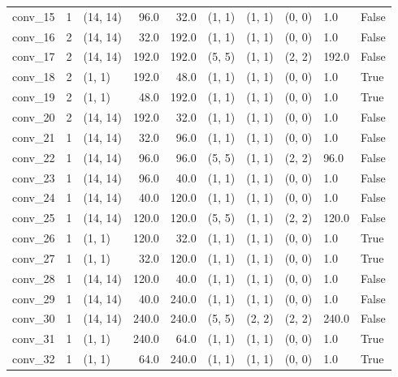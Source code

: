\begin{center}
\begin{tabular}{lrlrrlllll}
        conv\_15 &      1 &    (14, 14) &   96.0 &    32.0 &  (1, 1) &  (1, 1) &  (0, 0) &    1.0 &  False \\
        conv\_16 &      2 &    (14, 14) &   32.0 &   192.0 &  (1, 1) &  (1, 1) &  (0, 0) &    1.0 &  False \\
        conv\_17 &      2 &    (14, 14) &  192.0 &   192.0 &  (5, 5) &  (1, 1) &  (2, 2) &  192.0 &  False \\
        conv\_18 &      2 &      (1, 1) &  192.0 &    48.0 &  (1, 1) &  (1, 1) &  (0, 0) &    1.0 &   True \\
        conv\_19 &      2 &      (1, 1) &   48.0 &   192.0 &  (1, 1) &  (1, 1) &  (0, 0) &    1.0 &   True \\
        conv\_20 &      2 &    (14, 14) &  192.0 &    32.0 &  (1, 1) &  (1, 1) &  (0, 0) &    1.0 &  False \\
        conv\_21 &      1 &    (14, 14) &   32.0 &    96.0 &  (1, 1) &  (1, 1) &  (0, 0) &    1.0 &  False \\
        conv\_22 &      1 &    (14, 14) &   96.0 &    96.0 &  (5, 5) &  (1, 1) &  (2, 2) &   96.0 &  False \\
        conv\_23 &      1 &    (14, 14) &   96.0 &    40.0 &  (1, 1) &  (1, 1) &  (0, 0) &    1.0 &  False \\
        conv\_24 &      1 &    (14, 14) &   40.0 &   120.0 &  (1, 1) &  (1, 1) &  (0, 0) &    1.0 &  False \\
        conv\_25 &      1 &    (14, 14) &  120.0 &   120.0 &  (5, 5) &  (1, 1) &  (2, 2) &  120.0 &  False \\
        conv\_26 &      1 &      (1, 1) &  120.0 &    32.0 &  (1, 1) &  (1, 1) &  (0, 0) &    1.0 &   True \\
        conv\_27 &      1 &      (1, 1) &   32.0 &   120.0 &  (1, 1) &  (1, 1) &  (0, 0) &    1.0 &   True \\
        conv\_28 &      1 &    (14, 14) &  120.0 &    40.0 &  (1, 1) &  (1, 1) &  (0, 0) &    1.0 &  False \\
        conv\_29 &      1 &    (14, 14) &   40.0 &   240.0 &  (1, 1) &  (1, 1) &  (0, 0) &    1.0 &  False \\
        conv\_30 &      1 &    (14, 14) &  240.0 &   240.0 &  (5, 5) &  (2, 2) &  (2, 2) &  240.0 &  False \\
        conv\_31 &      1 &      (1, 1) &  240.0 &    64.0 &  (1, 1) &  (1, 1) &  (0, 0) &    1.0 &   True \\
        conv\_32 &      1 &      (1, 1) &   64.0 &   240.0 &  (1, 1) &  (1, 1) &  (0, 0) &    1.0 &   True \\

\end{tabular}
\end{center}
